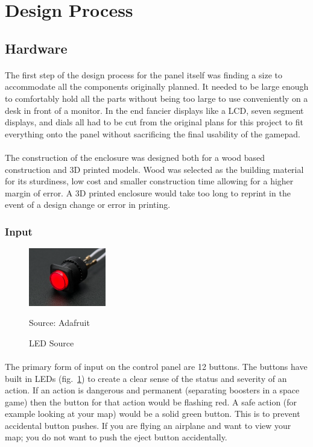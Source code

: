 \documentclass[12pt,a4paper]{article}
\newcommand{\source}[1]{\vspace{-0.6cm}\caption*{Source: {#1}} }
\begin{document}
\section{Design Process}
\subsection{Hardware}
\paragraph{}
The first step of the design process for the panel itself was finding a size to accommodate all the components originally planned. It needed to be large enough to comfortably hold all the parts without being too large to use conveniently on a desk in front of a monitor. In the end fancier displays like a \gls{LCD}, seven segment displays, and dials all had to be cut from the original plans for this project to fit everything onto the panel without sacrificing the final usability of the gamepad.
\paragraph{}
The construction of the enclosure was designed both for a wood based construction and 3D printed models. Wood was selected as the building material for its sturdiness, low cost and smaller construction time allowing for a higher margin of error. A 3D printed enclosure would take too long to reprint in the event of a design change or error in printing.
\newpage
\subsubsection{Input}
\begin{figure}
	\vspace*{0cm}
	\centering
	\includegraphics[width=0.3\textwidth]{button}
	\caption{LED Source}
	\source{Adafruit}
	\label{fig:button}
\end{figure}
\paragraph{}
The primary form of input on the control panel are 12 buttons. The buttons have built in \glspl{LED} (fig.~\ref{fig:button}) to create a clear sense of the status and severity of an action. If an action is dangerous and  permanent (separating boosters in a space game) then the button for that action would be flashing red. A safe action (for example looking at your map) would be a solid green button. This is to prevent accidental button pushes. If you are flying an airplane and want to view your map; you do not want to push the eject button accidentally.
\end{document}
